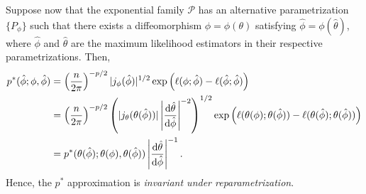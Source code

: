 Suppose now that the exponential family $\mathcal{P}$ has an alternative parametrization $\{ P_\phi \}$ such that there exists a diffeomorphism $\phi = \phi(\theta)$ satisfying $\hat\phi = \phi(\hat\theta)$, where $\hat\phi$ and $\hat\theta$ are the maximum likelihood estimators in their respective parametrizations. Then, 
\begin{align*}
    p^*(\hat\phi; \phi, \hat \phi) 
&= \left(\frac{n}{2\pi}\right)^{-p/2}|j_\phi(\hat\phi)|^{1/2} \exp\left(\ell(\phi; \hat \phi) - \ell(\hat\phi; \hat \phi)\right)\\
&= \left(\frac{n}{2\pi}\right)^{-p/2}\left(|j_\theta(\theta(\hat\phi))|\left|\frac{\text{d} \hat\theta}{\text{d} \hat\phi}\right|^{-2}\right)^{1/2} \exp\left(\ell(\theta(\phi); \theta(\hat \phi)) - \ell(\theta(\hat\phi); \theta(\hat \phi))\right)\\
&= p^*(\theta(\hat\phi); \theta(\phi), \theta(\hat \phi))\left|\frac{\text{d} \hat\theta}{\text{d} \hat\phi}\right|^{-1}.
\end{align*}
Hence, the $p^*$ approximation is \textit{invariant under reparametrization}. 

